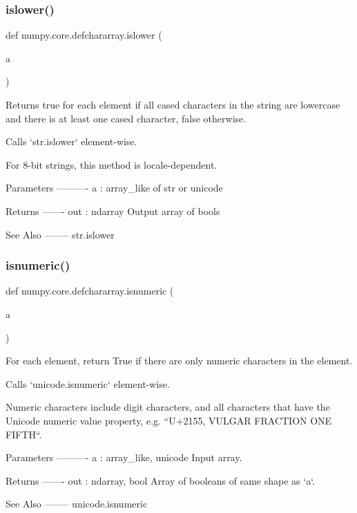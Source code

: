 \subsubsection{\texorpdfstring{islower()}{islower()}}
{\footnotesize\ttfamily def numpy.\+core.\+defchararray.\+islower (\begin{DoxyParamCaption}\item[{}]{a }\end{DoxyParamCaption})}

\begin{DoxyVerb}Returns true for each element if all cased characters in the
string are lowercase and there is at least one cased character,
false otherwise.

Calls `str.islower` element-wise.

For 8-bit strings, this method is locale-dependent.

Parameters
----------
a : array_like of str or unicode

Returns
-------
out : ndarray
    Output array of bools

See Also
--------
str.islower
\end{DoxyVerb}
 \mbox{\label{namespacenumpy_1_1core_1_1defchararray_ad919f4a6ecf5a64a8d5e8cbd69db1551}} 
\subsubsection{\texorpdfstring{isnumeric()}{isnumeric()}}
{\footnotesize\ttfamily def numpy.\+core.\+defchararray.\+isnumeric (\begin{DoxyParamCaption}\item[{}]{a }\end{DoxyParamCaption})}

\begin{DoxyVerb}For each element, return True if there are only numeric
characters in the element.

Calls `unicode.isnumeric` element-wise.

Numeric characters include digit characters, and all characters
that have the Unicode numeric value property, e.g. ``U+2155,
VULGAR FRACTION ONE FIFTH``.

Parameters
----------
a : array_like, unicode
    Input array.

Returns
-------
out : ndarray, bool
    Array of booleans of same shape as `a`.

See Also
--------
unicode.isnumeric\end{DoxyVerb}
 \mbox{\label{namespacenumpy_1_1core_1_1defchararray_a50319bf103ed2a8de426340f90b6ee88}} 
